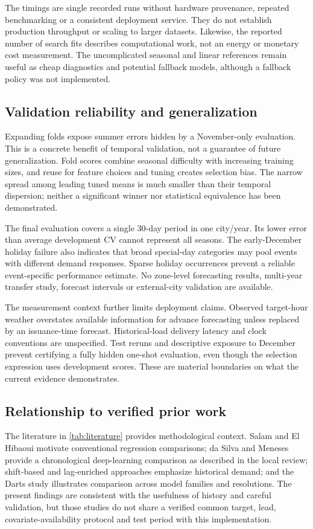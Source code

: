 The timings are single recorded runs without hardware provenance, repeated benchmarking or a consistent deployment service. They do not establish production throughput or scaling to larger datasets. Likewise, the reported number of search fits describes computational work, not an energy or monetary cost measurement. The uncomplicated seasonal and linear references remain useful as cheap diagnostics and potential fallback models, although a fallback policy was not implemented.

\subsection{Validation reliability and generalization}
Expanding folds expose summer errors hidden by a November-only evaluation. This is a concrete benefit of temporal validation, not a guarantee of future generalization. Fold scores combine seasonal difficulty with increasing training sizes, and reuse for feature choices and tuning creates selection bias. The narrow spread among leading tuned means is much smaller than their temporal dispersion; neither a significant winner nor statistical equivalence has been demonstrated.

The final evaluation covers a single 30-day period in one city/year. Its lower error than average development CV cannot represent all seasons. The early-December holiday failure also indicates that broad special-day categories may pool events with different demand responses. Sparse holiday occurrences prevent a reliable event-specific performance estimate. No zone-level forecasting results, multi-year transfer study, forecast intervals or external-city validation are available.

The measurement context further limits deployment claims. Observed target-hour weather overstates available information for advance forecasting unless replaced by an issuance-time forecast. Historical-load delivery latency and clock conventions are unspecified. Test reruns and descriptive exposure to December prevent certifying a fully hidden one-shot evaluation, even though the selection expression uses development scores. These are material boundaries on what the current evidence demonstrates.

\subsection{Relationship to verified prior work}
The literature in \cref{tab:literature} provides methodological context. Salam and El Hibaoui motivate conventional regression comparisons\cite{salam2018}; da Silva and Meneses provide a chronological deep-learning comparison as described in the local review\cite{silva2023}; shift-based and lag-enriched approaches emphasize historical demand\cite{islam2025,alsalem2025}; and the Darts study illustrates comparison across model families and resolutions\cite{biswas2026}. The present findings are consistent with the usefulness of history and careful validation, but those studies do not share a verified common target, lead, covariate-availability protocol and test period with this implementation.

